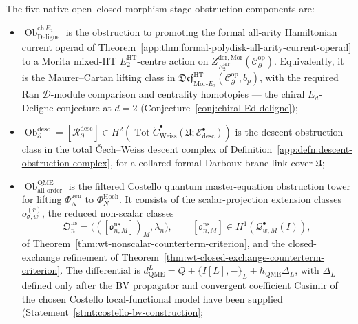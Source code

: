\documentclass[11pt]{memoir}
\begin{document}
\begin{thm}
  The five native open--closed morphism-stage obstruction components
  are:
  \begin{itemize}
    \item
      $\operatorname{Ob}^{\mathrm{ch}\,E_2}_{\mathrm{Deligne}}$ is
	      the obstruction to promoting the formal all-arity Hamiltonian
	      current operad of
	      Theorem~\ref{app:thm:formal-polydisk-all-arity-current-operad}
	      to a Morita mixed-HT \(E_2^{\mathrm{HT}}\)-centre action on
	      \(Z^{\mathrm{der},\mathrm{Mor}}_{E_2^{\mathrm{HT}}}
	      (\mathcal C^{\mathrm{op}}_\partial)\).  Equivalently, it is the
	      Maurer--Cartan lifting class in
	      \(\mathfrak{Def}^{\mathrm{HT}}_{\mathrm{Mor}\mbox{-}E_2}
	      (\mathcal C^{\mathrm{op}}_\partial,b_p)\), with the required Ran
	      \(\mathcal D\)-module comparison and centrality homotopies ---
	      the chiral $E_d$-Deligne conjecture at $d=2$
	      (Conjecture~\ref{conj:chiral-Ed-deligne});
	    \item
	      $\operatorname{Ob}^{\mathrm{desc}}_{\partial}=
	       [\mathcal R^{\mathrm{desc}}_{\partial}]\in
	       H^2\!\left(
	       \operatorname{Tot}\check C^\bullet_{\mathrm{Weiss}}
	       (\mathfrak U;\mathcal E^\bullet_{\mathrm{desc}})\right)$
	      is the descent obstruction class in the total
	      \v{C}ech--Weiss descent complex of
	      Definition~\ref{app:defn:descent-obstruction-complex}, for a
	      collared formal-Darboux brane-link cover \(\mathfrak U\);
    \item
	      $\operatorname{Ob}^{\mathrm{QME}}_{\mathrm{all\mbox{-}order}}$
	      is the filtered Costello quantum master-equation obstruction
	      tower for lifting \(\Phi_N^{\mathrm{gen}}\) to
	      \(\Phi_N^{\mathrm{Hoch}}\).
	      It consists of the scalar-projection extension classes
	      \(o_{\sigma,w}^{(r)}\), the reduced non-scalar classes
	      \[
	        \mathfrak O^{\mathrm{ns}}_n
	        =
	        \bigl(([\mathfrak o^{\mathrm{ns}}_{n,M}])_M,\lambda_n\bigr),
	        \qquad
	        [\mathfrak o^{\mathrm{ns}}_{n,M}]
	        \in H^1(\mathcal Q^\bullet_{w,M}(I)),
	      \]
	      of Theorem~\ref{thm:wt-nonscalar-counterterm-criterion}, and the
	      closed-exchange refinement of
	      Theorem~\ref{thm:wt-closed-exchange-counterterm-criterion}.  The
	      differential is
	      \(d_{\mathrm{QME}}^{L}=Q+\{I[L],-\}_{L}+\hbar_{\mathrm{QME}}\Delta_L\), with
		      \(\Delta_L\) defined only after the BV propagator and convergent
		      coefficient Casimir of the chosen Costello local-functional model
		      have been supplied (Statement~\ref{stmt:costello-bv-construction};

\end{itemize}
\end{thm}
\end{document}

